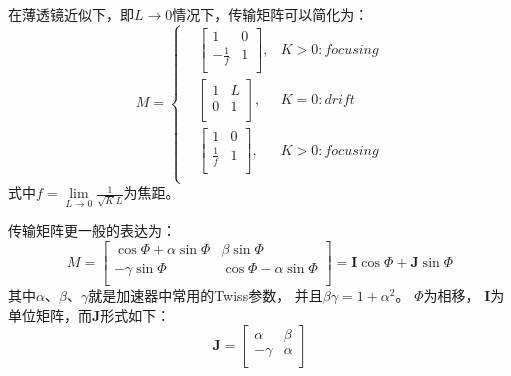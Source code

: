 在薄透镜近似下，即$L \rightarrow 0$情况下，传输矩阵可以简化为：
\begin{equation}
    \label{eq:Mathier_Hill_tranfermap_thinlen}
    M=\left\{
    \begin{aligned}
        &\begin{bmatrix}
          1              & 0  \\
         - \frac{1}{f}   & 1  \\
        \end{bmatrix}
        ,& K>0:focusing  \\
        &\begin{bmatrix}
          1 & L  \\
          0 & 1  \\
        \end{bmatrix}
        ,& K=0:drift  \\
        &\begin{bmatrix}
          1              & 0  \\
          \frac{1}{f}    & 1   \\
        \end{bmatrix}
        ,& K>0:focusing  \\
    \end{aligned}
    \right.
\end{equation}
式中$f = \lim \limits_{L \rightarrow 0} \frac{1}{\sqrt{K}L}$为焦距。

传输矩阵更一般的表达为：
\begin{equation}
    \label{eq:Mathier_Hill_tranfermap2}
    M=
    \begin{bmatrix}
      \cos \Phi + \alpha \sin \Phi    & \beta \sin \Phi  \\
      -\gamma \sin \Phi  & \cos \Phi - \alpha \sin \Phi  \\
    \end{bmatrix}
    =
    \textbf{I} \cos \Phi + \textbf{J} \sin \Phi
\end{equation}
其中$\alpha$、$\beta$、$\gamma$就是加速器中常用的Twiss参数，
并且$\beta \gamma = 1+{\alpha}^2$。
$\Phi$为相移，
$\textbf{I}$为单位矩阵，而$\textbf{J}$形式如下：
\begin{equation}
    \label{eq:Mathier_Hill_tranfermap3}
    \textbf{J}=
    \begin{bmatrix}
      \alpha    & \beta  \\
      -\gamma   & \alpha \\
    \end{bmatrix}
\end{equation}


